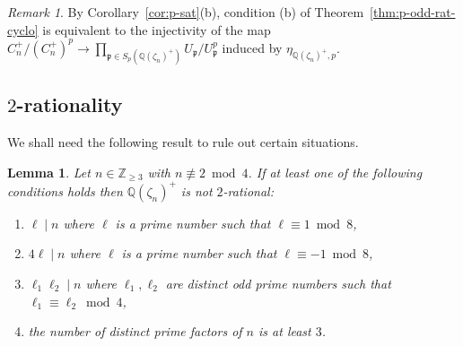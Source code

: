 \documentclass[12pt, a4paper, usenames]{amsart}
\newcommand{\Z}{\mathbb{Z}}
\newcommand{\Q}{\mathbb{Q}}
\theoremstyle{plain}
\newtheorem{lemma}[theorem]{Lemma}
\theoremstyle{remark}
\newtheorem{remark}[theorem]{Remark}
\theoremstyle{definition}
\begin{document}
\begin{remark}
By Corollary~\ref{cor:p-sat}(b), condition (b) of Theorem~\ref{thm:p-odd-rat-cyclo}
is equivalent to the injectivity of the map 
$C_{n}^{+}/(C_{n}^{+})^{p} \rightarrow \prod_{\mathfrak{p} \in S_{p}(\Q(\zeta_{n})^{+})} U_{\mathfrak{p}}/ U_{\mathfrak{p}}^{p}$ induced by 
$\eta_{\Q(\zeta_{n})^{+},p}$.
\end{remark}

\subsection{$2$-rationality}\label{subsec:real-cyclo-2-rat}
We shall need the following result to rule out certain situations.

\begin{lemma}\label{lem:2-rat}
Let $n \in \Z_{\geq 3}$ with $n \not \equiv 2 \bmod 4$.
If at least one of the following conditions holds then $\Q(\zeta_{n})^{+}$ is not $2$-rational:
\begin{enumerate}
    \item $\ell \mid n$ where $\ell$ is a prime number such that $\ell \equiv 1 \bmod{8}$,
    \item $4\ell \mid n$ where $\ell$ is a prime number such that $\ell \equiv -1 \bmod{8}$,
    \item $\ell_{1}\ell_{2} \mid n$ where $\ell_{1},\ell_{2}$ are distinct odd prime numbers such that 
    $\ell_{1} \equiv \ell_{2} \bmod{4}$,
    \item the number of distinct prime factors of $n$ is at least $3$.
\end{enumerate}
\end{lemma}
\end{document}
